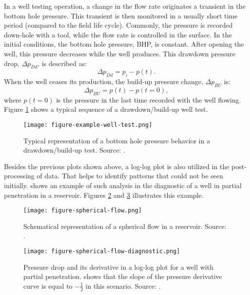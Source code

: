 In a well testing operation, a change in the flow rate originates a transient in the bottom hole pressure.
%
This transient is then monitored in a usually short time period (compared to the field life cycle).
%
Commonly, the pressure is recorded down-hole with a tool, while the flow rate is controlled in the surface.
%
In the initial conditions, the bottom hole pressure, BHP, is constant.
%
After opening the well, this pressure decreases while the well produces.
%
This drawdown pressure drop, $\Delta p_{Dd}$, is described as:
%
%
\begin{equation}
	\Delta p_{Dd} = p_i - p(t).
\end{equation}
%
When the well ceases its production, the build-up pressure change, $\Delta p_{BU}$ is:
%
\begin{equation}
	\Delta p_{BU} = p(t) - p(t=0),
\end{equation}
%
where $p(t=0)$ is the pressure in the last time recorded with the well flowing.
%
Figure \ref{figure-example-well-test} shows a typical sequence of a drawdown/build-up well test.
%
\begin{figure}[H]
	\label{figure-example-well-test}
	\centering
	\texttt{[image: figure-example-well-test.png]}
	\caption{Typical representation of a bottom hole pressure behavior in a drawdown/build-up test. Source: \cite{Bourdet2002}.}
\end{figure}
\noindent
%
Besides the previous plots shown above, a log-log plot is also utilized in the post-processing of data. 
%
That helps to identify patterns that could not be seen initially. 
%
\cite{Bourdet2002} shows an example of such analysis in the diagnostic of a well in partial penetration in a reservoir.
%
Figures \ref{figure-spherical-flow} and \ref{figure-spherical-flow-diagnostic} illustrates this example.
%
\begin{figure}[H]
	\centering
	\texttt{[image: figure-spherical-flow.png]}
	\caption{Schematical representation of a spherical flow in a reservoir. Source: \cite{Bourdet2002}.}
	\label{figure-spherical-flow}
\end{figure}
%
\begin{figure}[H]
	\centering
	\texttt{[image: figure-spherical-flow-diagnostic.png]}
	\caption{Pressure drop and its derivative in a log-log plot for a well with partial penetration. \cite{Bourdet2002} shows that the slope of the pressure derivative curve is equal to $-\frac{1}{2}$ in this scenario. Source: \cite{Bourdet2002}.}
	\label{figure-spherical-flow-diagnostic}
\end{figure}
